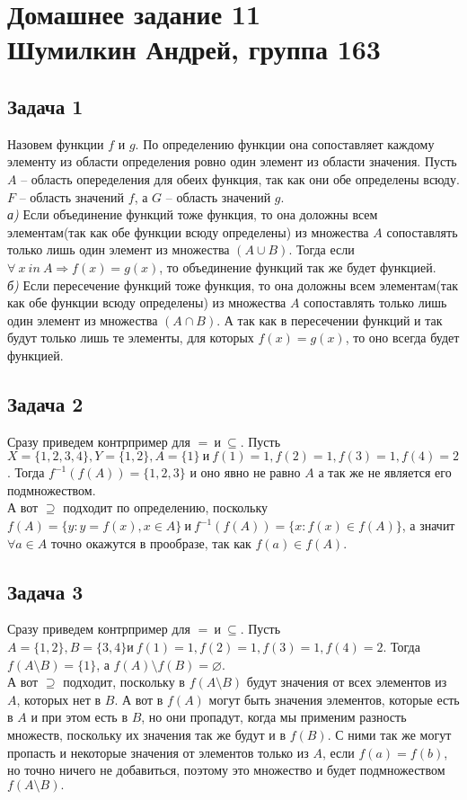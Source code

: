 

	\section{Домашнее задание 11\\ Шумилкин Андрей, группа 163} 
	\subsection{Задача 1}
	Назовем функции $f$ и $g$. По определению функции она сопоставляет каждому элементу из области определения ровно один элемент из области значения. Пусть $A$ -- область опеределения для обеих функция, так как они обе определены всюду. $F$ -- область значений $f$, а $G$ -- область значений $g$.\\
	\textit{а)} Если объединение функций тоже функция, то она доложны всем элементам(так как обе функции всюду определены) из множества $A$ сопоставлять только лишь один элемент из множества $(A \cup B)$. Тогда если $\forall\ x\ in\ A \Rightarrow  f(x) = g(x)$, то объединение функций так же будет функцией. \\
	\textit{б)} Если пересечение функций тоже функция, то она доложны всем элементам(так как обе функции всюду определены) из множества $A$ сопоставлять только лишь один элемент из множества $(A \cap B)$. А так как в пересечении функций и так будут только лишь те элементы, для которых $f(x) = g(x)$, то оно всегда будет функцией. \\
	
	\subsection{Задача 2}
	Сразу приведем контрпример для $=\ и\ \subseteq$. Пусть $X = \{1, 2, 3, 4\}, Y=\{1, 2\}, A=\{1\}\ и\ f(1) = 1, f(2) = 1, f(3) = 1, f(4) = 2$. Тогда $f^{-1}(f(A)) = \{1, 2, 3\}$ и оно явно не равно $A$ а так же не является его подмножеством. \\
	А вот $\supseteq$ подходит по определению, поскольку $f(A) = \{y : y=f(x), x \in A\}\ и\ f^{-1}(f(A)) = \{x : f(x) \in f(A)\}$, а значит $\forall a \in A$ точно окажутся в прообразе, так как $f(a) \in f(A)$.
	
	\subsection{Задача 3}
	Сразу приведем контрпример для $=\ и\ \subseteq$. Пусть $A = \{1, 2\}, B=\{3, 4\} и\ f(1) = 1, f(2) = 1, f(3) = 1, f(4) = 2$. Тогда $f(A \setminus B) = \{1\}$, а $f(A) \setminus f(B) = \varnothing$. \\
	А вот $\supseteq$ подходит, поскольку в $f(A \setminus B)$ будут значения от всех элементов из $A$, которых нет в $B$. А вот в $f(A)$ могут быть значения элементов, которые есть в $A$ и при этом есть в $B$, но они пропадут, когда мы применим разность множеств, поскольку их значения так же будут и в $f(B)$. С ними так же могут пропасть и некоторые значения от элементов только из $A$, если $f(a) = f(b)$, но точно ничего не добавиться, поэтому это множество и будет подмножеством $f(A \setminus B).$ 
	
